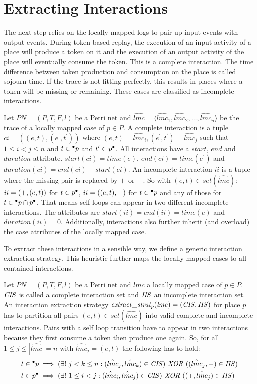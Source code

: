\section{Extracting Interactions}
The next step relies on the locally mapped logs to pair up input events with output events. During token-based replay, the execution of an input activity of a place will produce a token on it and the execution of an output activity of the place will eventually consume the token. This is a complete interaction. The time difference between token production and consumption on the place is called sojourn time. If the trace is not fitting perfectly, this results in places where a token will be missing or remaining. These cases are classified as incomplete interactions.
\begin{definition}
Let $PN = (P,T,F,l)$ be a Petri net and $\hat{lmc} = \langle \hat{lmc}_1, \hat{lmc}_2,\ldots, \hat{lmc}_n \rangle$ be the trace of a locally mapped case of $p\in P$. A complete interaction is a tuple $ci = ( (e,t), (e^\prime,t^\prime) )$ where $(e,t) = \hat{lmc}_i, (e^\prime, t^\prime) = \hat{lmc}_j$ such that $1\le i < j \le n$ and $t \in{{^{\bullet}p}}$ and $t^\prime \in{p^{\bullet}}$. All interactions have a $start$, $end$ and $duration$ attribute. $start(ci) = time(e)$, $end(ci) = time(e^\prime)$ and $duration(ci) = end(ci) - start(ci)$. An incomplete interaction $ii$ is a tuple where the missing pair is replaced by $+$ or $-$. So with $(e,t) \in set(\hat{lmc})$: $ii = (+, (e,t))$ for $t\in p^{\bullet}$, $ii = ((e,t), -)$ for $t\in {^{\bullet}p}$ and any of those for $t\in {^{\bullet}p} \cap p^{\bullet}$. That means self loops can appear in two different incomplete interactions. The attributes are $start(ii)=end(ii)=time(e)$ and $duration(ii) = 0$. Additionally, interactions also further inherit (and overload) the case attributes of the locally mapped case.
\end{definition}
To extract these interactions in a sensible way, we define a generic interaction extraction strategy. This heuristic further maps the locally mapped cases to all contained interactions.
\begin{definition}
Let $PN = (P,T,F,l)$ be a Petri net and $lmc$ a locally mapped case of $p\in P$. $\mathit{CIS}$ is called a complete interaction set and $\mathit{IIS}$ an incomplete interaction set. An interaction extraction strategy $\mathit{extract\_strat_p(lmc)}=\mathit{(\mathit{CIS}, \mathit{IIS})}$ for place $p$ has to partition all pairs $(e,t)\in set(\hat{lmc})$ into valid complete and incomplete interactions. Pairs with a self loop transition have to appear in two interactions because they first consume a token then produce one again. So, for all $1\le j \le  |\hat{lmc}|=n$ with $\hat{lmc}_j=(e,t)$ the following has to hold:
\begin{align}
    &t\in {^{\bullet}p} \implies (\exists!\ j < k \le n: (\hat{lmc}_j, \hat{lmc}_k)\in \mathit{CIS}) \ \mathit{XOR}\  ((\hat{lmc}_j,-) \in \mathit{IIS}) \label{eq:1}\\
    &t\in p^{\bullet} \implies (\exists!\ 1\le i < j: (\hat{lmc}_i, \hat{lmc}_j)\in \mathit{CIS}) \ \mathit{XOR}\  ((+,\hat{lmc}_j) \in \mathit{IIS}) \label{eq:2}
\end{align}
\end{definition}
